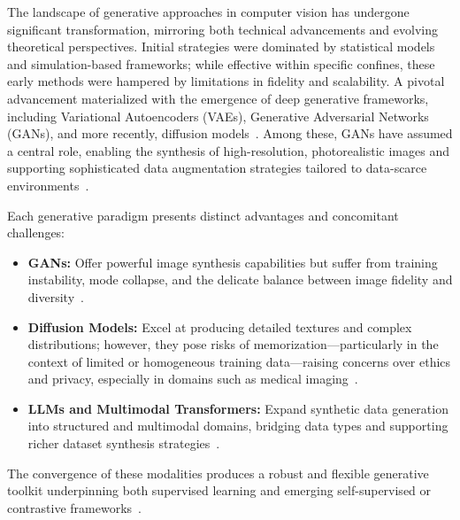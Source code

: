 \documentclass[11pt]{article}
\begin{document}
The landscape of generative approaches in computer vision has undergone significant transformation, mirroring both technical advancements and evolving theoretical perspectives. Initial strategies were dominated by statistical models and simulation-based frameworks; while effective within specific confines, these early methods were hampered by limitations in fidelity and scalability. A pivotal advancement materialized with the emergence of deep generative frameworks, including Variational Autoencoders (VAEs), Generative Adversarial Networks (GANs), and more recently, diffusion models~\cite{ref33,ref35,ref43,ref62,ref64,ref65}. Among these, GANs have assumed a central role, enabling the synthesis of high-resolution, photorealistic images and supporting sophisticated data augmentation strategies tailored to data-scarce environments~\cite{ref33,ref35,ref62,ref65}.

Each generative paradigm presents distinct advantages and concomitant challenges:

\begin{itemize}
    \item \textbf{GANs:} Offer powerful image synthesis capabilities but suffer from training instability, mode collapse, and the delicate balance between image fidelity and diversity~\cite{ref33,ref35}.
    \item \textbf{Diffusion Models:} Excel at producing detailed textures and complex distributions; however, they pose risks of memorization—particularly in the context of limited or homogeneous training data—raising concerns over ethics and privacy, especially in domains such as medical imaging~\cite{ref62}.
    \item \textbf{LLMs and Multimodal Transformers:} Expand synthetic data generation into structured and multimodal domains, bridging data types and supporting richer dataset synthesis strategies~\cite{ref35,ref49,ref87}.
\end{itemize}

The convergence of these modalities produces a robust and flexible generative toolkit underpinning both supervised learning and emerging self-supervised or contrastive frameworks~\cite{ref35,ref49,ref65}.
\end{document}
